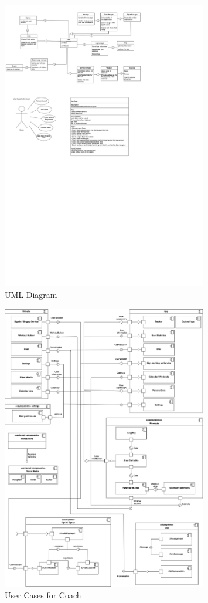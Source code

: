    \begin{figure}[H]
    \centering
    \includegraphics[width=0.8\textwidth]{images/usercase.png}
    \caption{ UML Diagram }
    \label{fig:usercase}
  \end{figure}

  \begin{figure}[H]
    \centering
    \includegraphics[width=0.8\textwidth]{images/component.png}
    \caption{ User Cases for Coach }
    \label{fig:component}
  \end{figure}



